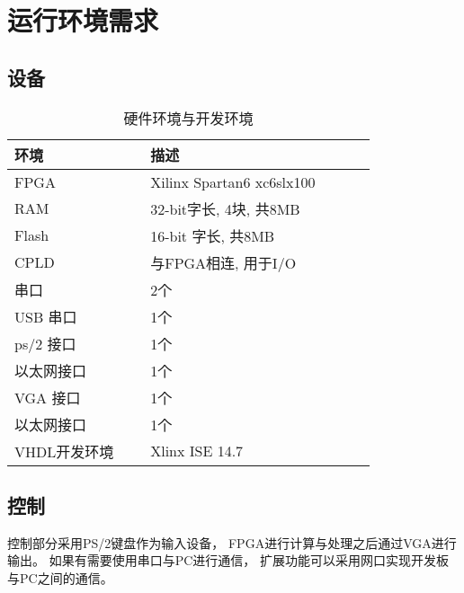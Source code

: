 \section{运行环境需求}
    \subsection{设备}
        \begin{longtable}{|p{0.3\linewidth}|p{0.5\linewidth}|}
        \caption{硬件环境与开发环境}
        \hline
        环境　& 描述　\\
        \hline
        FPGA & Xilinx Spartan6 xc6slx100 \\
        \hline
        RAM & 32-bit字长, 4块, 共8MB \\
        \hline
        Flash & 16-bit 字长, 共8MB \\
        \hline
        CPLD & 与FPGA相连, 用于I/O \\
        \hline
        串口 & 2个　\\
        \hline
        USB 串口 & 1个 \\
        \hline
        ps/2 接口 & 1个 \\
        \hline
        以太网接口 & 1个 \\
        \hline
        VGA 接口 & 1个 \\
        \hline
        以太网接口 & 1个 \\
        \hline
        VHDL开发环境 & Xlinx ISE 14.7 \\
        \hline
        \end{longtable}
    \subsection{控制}
        控制部分采用PS/2键盘作为输入设备，%
        FPGA进行计算与处理之后通过VGA进行输出。%
        如果有需要使用串口与PC进行通信，%
        扩展功能可以采用网口实现开发板与PC之间的通信。


